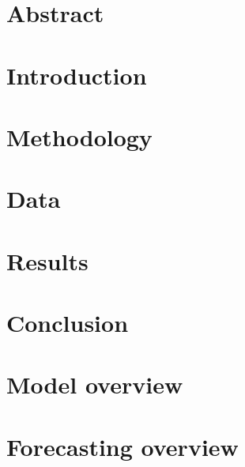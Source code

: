 \documentclass[a4paper,11pt]{report}
\begin{document}


\chapter*{Abstract}


\tableofcontents
\newpage

\chapter{Introduction}


\chapter{Methodology}


\chapter{Data}


\chapter{Results}


\chapter{Conclusion}


\appendix
\chapter{Model overview}


\chapter{Forecasting overview}


\printbibliography
\end{document}
